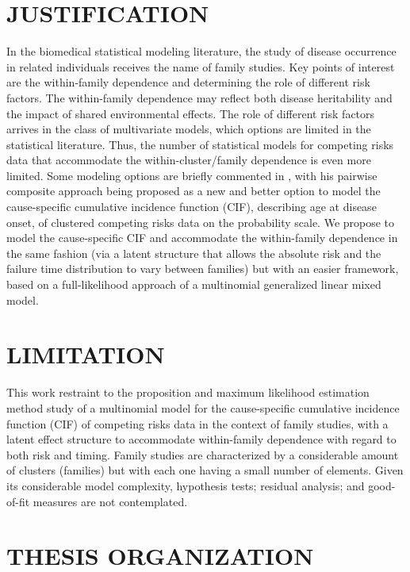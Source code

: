 \section{JUSTIFICATION}

In the biomedical statistical modeling literature, the study of disease
occurrence in related individuals receives the name of family studies.
Key points of interest are the within-family dependence and determining
the role of different risk factors. The within-family dependence may
reflect both disease heritability and the impact of shared environmental
effects. The role of different risk factors arrives in the class of
multivariate models, which options are limited in the statistical
literature. Thus, the number of statistical models for competing risks
data that accommodate the within-cluster/family dependence is even more
limited. Some modeling options are briefly commented in
, with his pairwise composite approach being
proposed as a new and better option to model the cause-specific
cumulative incidence function (CIF), describing age at disease onset, of
clustered competing risks data on the probability scale. We propose to
model the cause-specific CIF and accommodate the within-family
dependence in the same fashion (via a latent structure that allows the
absolute risk and the failure time distribution to vary between
families) but with an easier framework, based on a full-likelihood
approach of a multinomial generalized linear mixed model.

\section{LIMITATION}

This work restraint to the proposition and maximum likelihood estimation
method study of a multinomial model for the cause-specific cumulative
incidence function (CIF) of competing risks data in the context of
family studies, with a latent effect structure to accommodate
within-family dependence with regard to both risk and timing. Family
studies are characterized by a considerable amount of clusters
(families) but with each one having a small number of elements. Given
its considerable model complexity, hypothesis tests; residual analysis;
and good-of-fit measures are not contemplated.

\section{THESIS ORGANIZATION}

